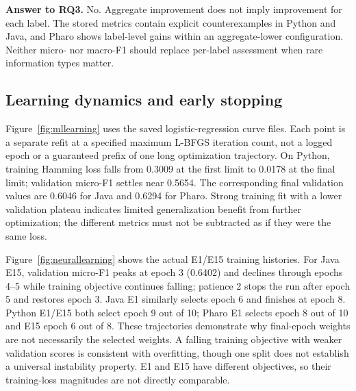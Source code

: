 \textbf{Answer to RQ3.} No. Aggregate improvement does not imply improvement for each label. The stored metrics contain explicit counterexamples in Python and Java, and Pharo shows label-level gains within an aggregate-lower configuration. Neither micro- nor macro-F1 should replace per-label assessment when rare information types matter.


\subsection{Learning dynamics and early stopping}\label{sec:learning}
Figure~\ref{fig:mllearning} uses the saved logistic-regression curve files. Each point is a separate refit at a specified maximum L-BFGS iteration count, not a logged epoch or a guaranteed prefix of one long optimization trajectory. On Python, training Hamming loss falls from 0.3009 at the first limit to 0.0178 at the final limit; validation micro-F1 settles near 0.5654. The corresponding final validation values are 0.6046 for Java and 0.6294 for Pharo. Strong training fit with a lower validation plateau indicates limited generalization benefit from further optimization; the different metrics must not be subtracted as if they were the same loss.

Figure~\ref{fig:neurallearning} shows the actual E1/E15 training histories. For Java E15, validation micro-F1 peaks at epoch 3 (0.6402) and declines through epochs 4--5 while training objective continues falling; patience 2 stops the run after epoch 5 and restores epoch 3. Java E1 similarly selects epoch 6 and finishes at epoch 8. Python E1/E15 both select epoch 9 out of 10; Pharo E1 selects epoch 8 out of 10 and E15 epoch 6 out of 8. These trajectories demonstrate why final-epoch weights are not necessarily the selected weights. A falling training objective with weaker validation scores is consistent with overfitting, though one split does not establish a universal instability property. E1 and E15 have different objectives, so their training-loss magnitudes are not directly comparable.

